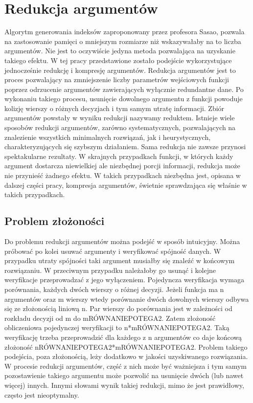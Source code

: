 \chapter{Redukcja argumentów}

Algorytm generowania indeksów zaproponowany przez profesora Sasao, pozwala na zastosowanie pamięci o mniejszym rozmiarze niż wskazywałaby na to liczba argumentów.
Nie jest to oczywiście jedyna metoda pozwalająca na  uzyskanie takiego efektu.
W tej pracy przedstawione zostało podejście wykorzystujące jednocześnie redukcję i kompresję argumentów.
Redukcja argumentów jest to proces pozwalający na zmniejszenie liczby parametrów wejściowych funkcji poprzez odrzucenie argumentów zawierających wyłącznie redundantne dane.
Po wykonaniu takiego procesu, usunięcie dowolnego argumentu z funkcji powoduje kolizję wierszy o różnych decyzjach i tym samym utratę informacji.
Zbiór argumentów powstały w wyniku redukcji nazywamy reduktem.
Istnieje wiele sposobów redukcji argumentów, zarówno systematycznych, pozwalających na znalezienie wszystkich minimalnych rozwiązań, jak i heurystycznych, charakteryzujących się szybszym działaniem.
Sama redukcja nie zawsze przynosi spektakularne rezultaty.
W skrajnych przypadkach funkcji, w których każdy argument dostarcza niewielkiej ale niezbędnej porcji informacji, redukcja może nie przynieść żadnego efektu.
W takich przypadkach niezbędna jest, opisana w dalszej części pracy, kompresja argumentów, świetnie sprawdzająca się właśnie w takich przypadkach.

\section{Problem złożoności}

Do problemu redukcji argumentów można podejść w sposób intuicyjny.
Można próbować po kolei usuwać argumenty i weryfikować spójność danych.
W przypadku utraty spójności taki argument musiałby się znaleźć w końcowym rozwiązaniu.
W przeciwnym przypadku należałoby go usunąć i kolejne weryfikacje przeprowadzać z jego wyłączeniem.
Pojedyncza weryfikacja wymaga porównania, każdych dwóch wierszy o różnej decyzji.
Jeżeli funkcja ma n argumentów oraz m wierszy wtedy porównanie dwóch dowolnych wierszy odbywa się ze złożonością liniową n.
Par wierszy do porównania jest w zależności od rozkładu decyzji od m do mRÓWNANIEPOTEGA2.
Zatem złożoność obliczeniowa pojedynczej weryfikacji to n*mRÓWNANIEPOTEGA2.
Taką weryfikację trzeba przeprowadzić dla każdego z n argumentów co daje końcową złożoność nRÓWNANIEPOTEGA2*mRÓWNANIEPOTEGA2.
Problem takiego podejścia, poza złożonością, leży dodatkowo w jakości uzyskiwanego rozwiązania.
W procesie redukcji argumentów, część z nich może być ważniejsza i tym samym pozostawienie takiego argumentu może pozwolić na usunięcie dwóch (lub nawet więcej) innych.
Innymi słowami wynik takiej redukcji, mimo że jest prawidłowy, często jest nieoptymalny.

